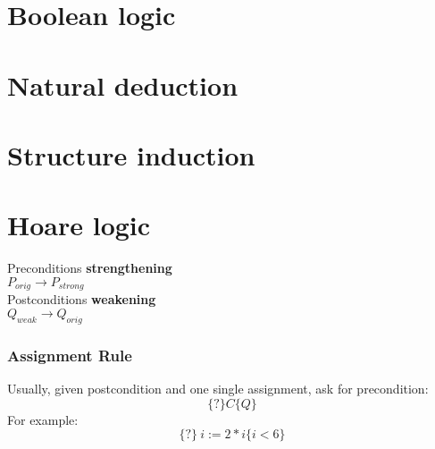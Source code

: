 \documentclass[10pt,landscape]{article}
\begin{document}
\begin{multicols*}{3}
\section{Boolean logic}

\section{Natural deduction}

\section{Structure induction}

\section{Hoare logic}
Preconditions \textbf{strengthening}\\
\(P_{orig} \rightarrow P_{strong} \)\\
Post\-conditions \textbf{weakening}\\
\(Q_{weak} \rightarrow Q_{orig} \)

\subsubsection*{Assignment Rule}
Usually, given post\-condition and one single assignment, ask for pre\-condition:
\[
  \{?\}C\{Q\}
\]
For example:
\[
  \{?\}\ i := 2 * i \{i < 6\}
\]

\end{multicols*}
\end{document}
